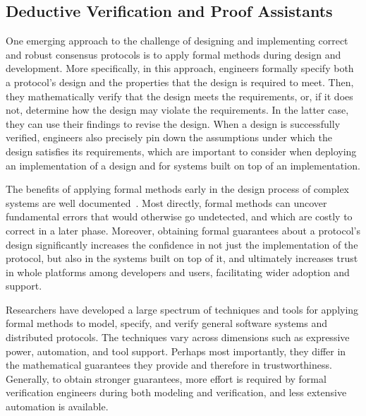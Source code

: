 
\subsection{Deductive Verification and Proof Assistants}

One emerging approach to the challenge of designing and implementing correct and robust consensus protocols is to apply formal methods during design and development. More specifically, in this approach, engineers formally specify both a protocol's design and the properties that the design is required to meet. Then, they mathematically verify that the design meets the requirements, or, if it does not, determine how the design may violate the requirements. In the latter case, they can use their findings to revise the design. When a design is successfully verified, engineers also precisely pin down the assumptions under which the design satisfies its requirements, which are important to consider when deploying an implementation of a design and for systems built on top of an implementation.

The benefits of applying formal methods early in the design process of complex systems are well documented~\cite{Yang2011,Fonseca2017}. Most directly, formal methods can uncover fundamental errors that would otherwise go undetected, and which are costly to correct in a later phase. Moreover, obtaining formal guarantees about a protocol's design significantly increases the confidence in not just the implementation of the protocol, but also in the systems built on top of it, and ultimately increases trust in whole platforms among developers and users, facilitating wider adoption and support.

Researchers have developed a large spectrum of techniques and tools for applying formal methods to model, specify, and verify general software systems and distributed protocols. The techniques vary across dimensions such as expressive power, automation, and tool support. Perhaps most importantly, they differ in the mathematical guarantees they provide and therefore in trustworthiness. Generally, to obtain stronger guarantees, more effort is required by formal verification engineers during both modeling and verification, and less extensive automation is available.


